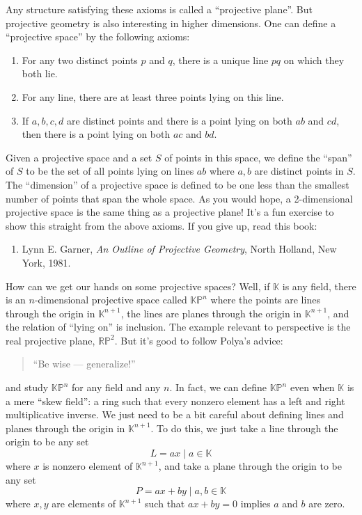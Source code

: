 \documentclass{article}
\def\tightlist{}
\begin{document}
Any structure satisfying these axioms is called a ``projective plane''.
But projective geometry is also interesting in higher dimensions. One
can define a ``projective space'' by the following axioms:

\begin{enumerate}
\def\labelenumi{\Alph{enumi})}
\item
  For any two distinct points \(p\) and \(q\), there is a unique line
  \(pq\) on which they both lie.
\item
  For any line, there are at least three points lying on this line.
\item
  If \(a,b,c,d\) are distinct points and there is a point lying on both
  \(ab\) and \(cd\), then there is a point lying on both \(ac\) and
  \(bd\).
\end{enumerate}

Given a projective space and a set \(S\) of points in this space, we
define the ``span'' of \(S\) to be the set of all points lying on lines
\(ab\) where \(a,b\) are distinct points in \(S\). The ``dimension'' of
a projective space is defined to be one less than the smallest number of
points that span the whole space. As you would hope, a 2-dimensional
projective space is the same thing as a projective plane! It's a fun
exercise to show this straight from the above axioms. If you give up,
read this book:

\begin{enumerate}
\def\labelenumi{\arabic{enumi})}
\setcounter{enumi}{3}
\tightlist
\item
  Lynn E. Garner, \emph{An Outline of Projective Geometry}, North
  Holland, New York, 1981.
\end{enumerate}

How can we get our hands on some projective spaces? Well, if
\(\mathbb{K}\) is any field, there is an \(n\)-dimensional projective
space called \(\mathbb{KP}^n\) where the points are lines through the
origin in \(\mathbb{K}^{n+1}\), the lines are planes through the origin
in \(\mathbb{K}^{n+1}\), and the relation of ``lying on'' is inclusion.
The example relevant to perspective is the real projective plane,
\(\mathbb{RP}^2\). But it's good to follow Polya's advice:

\begin{quote}
``Be wise --- generalize!''
\end{quote}

and study \(\mathbb{KP}^n\) for any field and any \(n\). In fact, we can
define \(\mathbb{KP}^n\) even when \(\mathbb{K}\) is a mere ``skew
field'': a ring such that every nonzero element has a left and right
multiplicative inverse. We just need to be a bit careful about defining
lines and planes through the origin in \(\mathbb{K}^{n+1}\). To do this,
we just take a line through the origin to be any set
\[L = {ax \mid a\in\mathbb{K}}\] where \(x\) is nonzero element of
\(\mathbb{K}^{n+1}\), and take a plane through the origin to be any set
\[P = {ax + by \mid a,b\in\mathbb{K}}\] where \(x,y\) are elements of
\(\mathbb{K}^{n+1}\) such that \(ax + by = 0\) implies \(a\) and \(b\)
are zero.
\end{document}
